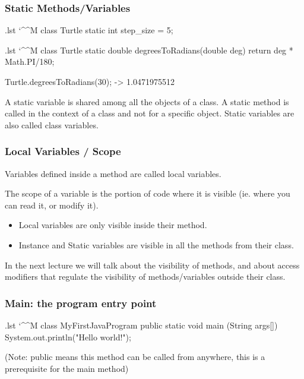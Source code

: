 \documentclass[10pt]{beamer}
\makeatletter
\newenvironment{code}{%
  \begingroup
  \@bsphack
  \immediate\openout\lstvrb@out\jobname.lst
  \let\do\@makeother\dospecials\catcode`\^^M\active
  \def\verbatim@processline{%
    \immediate\write\lstvrb@out{\the\verbatim@line}}%
  \verbatim@start}{%
  \immediate\closeout\lstvrb@out
  \@esphack
  \endgroup

  \begin{alertblock}{}
    
  \end{alertblock}}
\makeatother
\begin{document}
\begin{frame}
  \frametitle{Static Methods/Variables}
    \begin{code}
class Turtle {
  static int step_size = 5;
}
    \end{code}
    \pause
    \begin{code}
class Turtle {
  static double degreesToRadians(double deg) {
    return deg * Math.PI/180;
  }
}

Turtle.degreesToRadians(30); -> 1.0471975512

    \end{code}
    \pause
    \begin{definition}
      A static variable is shared among all the objects of a class.
      A static method is called in the context of a class and not for a specific object.
      Static variables are also called class variables.
    \end{definition}
\end{frame}

\begin{frame}
  \frametitle{Local Variables / Scope}
  \begin{definition}
    Variables defined inside a method are called local variables.

    The scope of a variable is the portion of code where it is visible (ie. where you can read it,
    or modify it).
   \end{definition}

    \begin{itemize}
      \item Local variables are only visible inside their method.
      \item Instance and Static variables are visible in all the methods from their class.
    \end{itemize}

    In the next lecture we will talk about the visibility of methods, and about access modifiers
    that regulate the visibility of methods/variables outside their class.
\end{frame}


\begin{frame}[fragile]
  \frametitle{Main: the program entry point}
  \begin{code}
    class MyFirstJavaProgram{
      public static void main (String args[]) {
        System.out.println("Hello world!");
      }
    }
  \end{code}
  (Note: public means this method can be called from anywhere, this is a prerequisite for
   the main method)
\end{frame}
\end{document}
